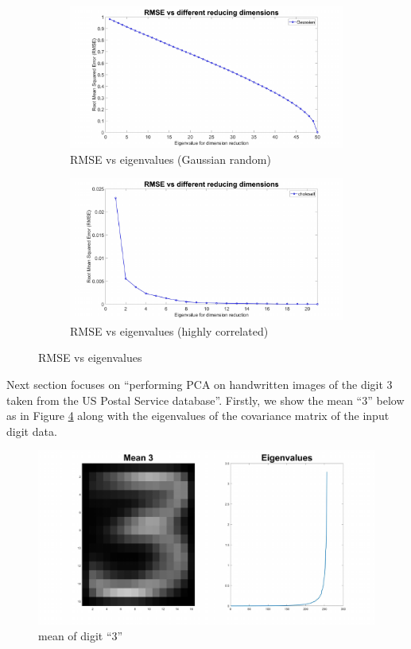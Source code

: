 \documentclass{article}
\begin{document}
\begin{figure}[h!]
\begin{subfigure}[b]{.49\textwidth}
  \centering
  \includegraphics[width=\linewidth]{lab3/gaussianrmse.pdf}
  \caption{RMSE vs eigenvalues (Gaussian random)}
  \label{fig:pcaGaussian}
\end{subfigure}
\hfill
\begin{subfigure}[b]{.49\textwidth}
  \centering
  \includegraphics[width=\linewidth]{lab3/choles.pdf}
  \caption{RMSE vs eigenvalues (highly correlated)}
  \label{fig:pcacholes}
\end{subfigure}
\caption{RMSE vs eigenvalues}
\label{fig:pca1}
\end{figure}

Next section focuses on ``performing PCA on handwritten images of the digit 3 taken from the US Postal Service database''. Firstly, we show the mean ``3'' below as in Figure \ref{fig:mean3} along with the eigenvalues of the covariance matrix of the input digit data.

\begin{figure}[h!]
  \centering
  \includegraphics[width=\textwidth]{lab3/mean3eigenvalues.pdf}
  \caption{mean of digit ``3''}
  \label{fig:mean3}
\end{figure}
\end{document}
